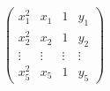 \documentclass[preview]{standalone}
\begin{document}
\begin{align*}
\left(\begin{array}{ccc|c} x_1^2 & x_1 & 1 & y_1 \\ x_2^2 & x_2 & 1 & y_2 \\ \vdots & \vdots & \vdots & \vdots \\ x_5^2 & x_5 & 1 & y_5 \end{array}\right)
\end{align*}
\end{document}
